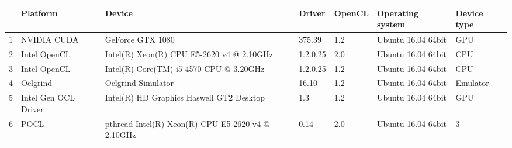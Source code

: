 \begin{tabular}{lllllll}
\toprule
{} &              Platform &                                             Device &    Driver & OpenCL &    Operating system & Device type \\
\midrule
1 &           NVIDIA CUDA &                                   GeForce GTX 1080 &    375.39 &    1.2 &  Ubuntu 16.04 64bit &         GPU \\
2 &          Intel OpenCL &          Intel(R) Xeon(R) CPU E5-2620 v4 @ 2.10GHz &  1.2.0.25 &    2.0 &  Ubuntu 16.04 64bit &         CPU \\
3 &          Intel OpenCL &            Intel(R) Core(TM) i5-4570 CPU @ 3.20GHz &  1.2.0.25 &    1.2 &  Ubuntu 16.04 64bit &         CPU \\
4 &              Oclgrind &                                 Oclgrind Simulator &     16.10 &    1.2 &  Ubuntu 16.04 64bit &    Emulator \\
5 &  Intel Gen OCL Driver &           Intel(R) HD Graphics Haswell GT2 Desktop &       1.3 &    1.2 &  Ubuntu 16.04 64bit &         GPU \\
6 &                  POCL &  pthread-Intel(R) Xeon(R) CPU E5-2620 v4 @ 2.10GHz &      0.14 &    2.0 &  Ubuntu 16.04 64bit &           3 \\
\bottomrule
\end{tabular}
